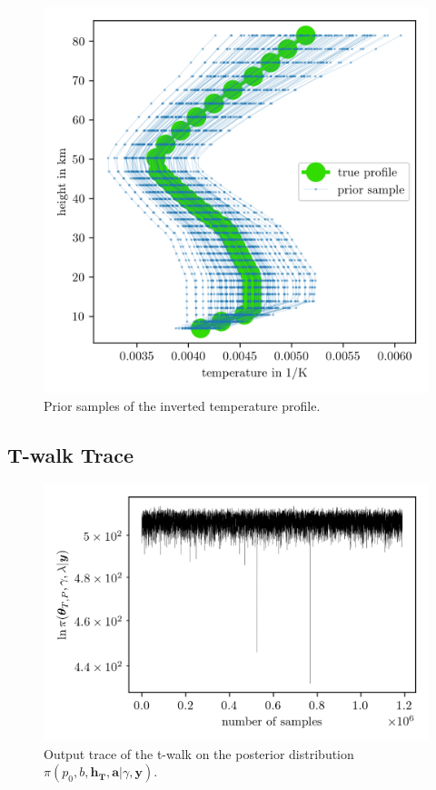 \begin{figure}[ht!]
	\centering
	\includegraphics{PriorOverTempPost.png}
	\caption[Prior samples of $1/\bm{T}$]{Prior samples of the inverted temperature profile.}
	\label{fig:OverTempPrior}
\end{figure}
\clearpage
\subsection{T-walk Trace}
\begin{figure}[ht!]
	\centering
	\includegraphics{TraceTwalk.png}
	\caption[T-walk trace]{Output trace of the t-walk on the posterior distribution $\pi(p_0,b,\bm{h_T},\bm{a}| \gamma,\bm{y})$.}
	\label{fig:TraceTwalk}
\end{figure}
\clearpage

